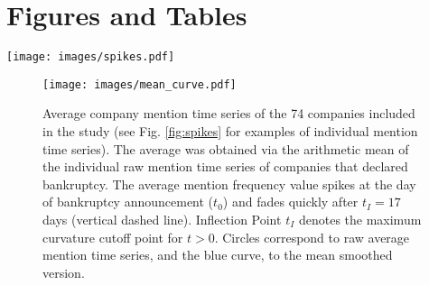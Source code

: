 \documentclass[9pt,twocolumn,twoside,lineno]{pnas-new}
\begin{document}
\newpage

\section*{Figures and Tables}

\begin{figure*}[h!]
\centering
    \texttt{[image: images/spikes.pdf]}
    \caption{ 
            Examples of mention time series for 8 companies, as recorded from Twitter posts (tweets).
            Companies' Twitter handles begin with `@' above each figure.
            Companies in the top row experienced a rapid increase followed by a quick decay in attention after bankruptcy announcement at $t_0$.
            Companies in the bottom row also experienced a rapid increase in attention following bankruptcy, but attention was more persistent (decreased more slowly) compared with companies in the top row in terms of days until returning to pre-announcement mean.
            From each mention time series, we extract three characteristic values (illustrated in the top left figure): Pre-Announcement Mean (PAM), Short-Term Boost, and Long-Term Boost, as defined in Table \ref{tbl:def}.
            }
    \label{fig:spikes}
\end{figure*}


\newpage

\begin{figure}[h!]
\center
    \texttt{[image: images/mean\_curve.pdf]}
    \caption{ 
           Average company mention time series of the 74 companies included in the study (see Fig. \ref{fig:spikes} for examples of individual mention time series). 
            The average was obtained via the arithmetic mean of the individual raw mention time series of companies that declared bankruptcy.
            The average mention frequency value spikes at the day of bankruptcy announcement ($t_0$) and fades quickly after $t_I=17$ days (vertical dashed line).
            Inflection Point $t_I$ denotes the maximum curvature cutoff point for $t>0$.
            Circles correspond to raw average mention time series, and the blue curve, to the mean smoothed version.
            }
    \label{fig:mean_curve}
\end{figure}

\newpage
\end{document}
